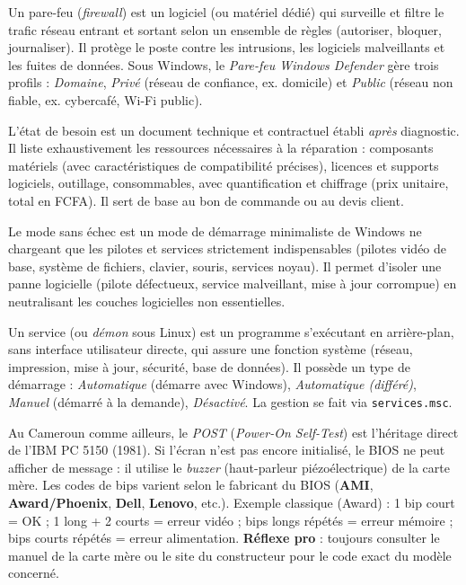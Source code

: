 \documentclass[11pt]{article}
\newcommand{\cle}[1]{{\popxbold\color{popdark}#1}}
\begin{document}
\begin{definition}
Un \cle{pare-feu} (\emph{firewall}) est un logiciel (ou matériel dédié) qui surveille et filtre le trafic réseau entrant et sortant selon un ensemble de \cle{règles} (autoriser, bloquer, journaliser). Il protège le poste contre les intrusions, les logiciels malveillants et les fuites de données. Sous Windows, le \emph{Pare-feu Windows Defender} gère trois profils : \emph{Domaine}, \emph{Privé} (réseau de confiance, ex. domicile) et \emph{Public} (réseau non fiable, ex. cybercafé, Wi-Fi public).
\end{definition}

\begin{definition}
L'\cle{état de besoin} est un document technique et contractuel établi \emph{après} diagnostic. Il liste exhaustivement les ressources nécessaires à la réparation : composants matériels (avec caractéristiques de compatibilité précises), licences et supports logiciels, outillage, consommables, avec quantification et chiffrage (prix unitaire, total en FCFA). Il sert de base au bon de commande ou au devis client.
\end{definition}

\begin{definition}
Le \cle{mode sans échec} est un mode de démarrage minimaliste de Windows ne chargeant que les pilotes et services strictement indispensables (pilotes vidéo de base, système de fichiers, clavier, souris, services noyau). Il permet d'isoler une panne logicielle (pilote défectueux, service malveillant, mise à jour corrompue) en neutralisant les couches logicielles non essentielles.
\end{definition}

\begin{definition}
Un \cle{service} (ou \emph{démon} sous Linux) est un programme s'exécutant en arrière-plan, sans interface utilisateur directe, qui assure une fonction système (réseau, impression, mise à jour, sécurité, base de données). Il possède un \cle{type de démarrage} : \emph{Automatique} (démarre avec Windows), \emph{Automatique (différé)}, \emph{Manuel} (démarré à la demande), \emph{Désactivé}. La gestion se fait via \texttt{services.msc}.
\end{definition}

\begin{savaistu}
Au Cameroun comme ailleurs, le \emph{POST} (\emph{Power-On Self-Test}) est l'héritage direct de l'IBM PC 5150 (1981). Si l'écran n'est pas encore initialisé, le BIOS ne peut afficher de message : il utilise le \emph{buzzer} (haut-parleur piézoélectrique) de la carte mère. Les codes de bips varient selon le fabricant du BIOS (\textbf{AMI}, \textbf{Award/Phoenix}, \textbf{Dell}, \textbf{Lenovo}, etc.). Exemple classique (Award) : 1 bip court = OK ; 1 long + 2 courts = erreur vidéo ; bips longs répétés = erreur mémoire ; bips courts répétés = erreur alimentation. \textbf{Réflexe pro} : toujours consulter le manuel de la carte mère ou le site du constructeur pour le code exact du modèle concerné.
\end{savaistu}
\end{document}
